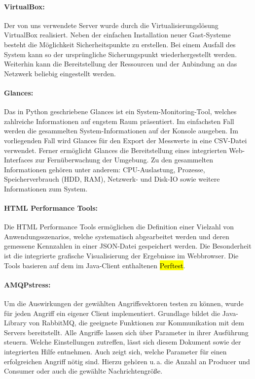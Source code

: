 \documentclass[	a4paper,
			11pt,
			oneside,
			parskip]{scrartcl}
\begin{document}
	\paragraph{VirtualBox:} Der von uns verwendete Server wurde durch die Virtualisierungslösung VirtualBox realisiert. Neben der einfachen Installation neuer Gast-Systeme besteht die Möglichkeit Sicherheitspunkte zu erstellen. Bei einem Ausfall des System kann so der ursprüngliche Sicherungspunkt wiederhergestellt werden. Weiterhin kann die Bereitstellung der Ressourcen und der Anbindung an das Netzwerk beliebig eingestellt werden.
	
	\paragraph{Glances:} Das in Python geschriebene Glances ist ein System-Monitoring-Tool, welches zahlreiche Informationen auf engstem Raum präsentiert. Im einfachsten Fall werden die gesammelten System-Informationen auf der Konsole ausgeben.
	 Im vorliegenden Fall wird Glances für den Export der Messwerte in eine CSV-Datei verwendet. Ferner ermöglicht Glances die Bereitstellung eines integrierten Web-Interfaces zur Fernüberwachung der Umgebung.
	 Zu den gesammelten Informationen gehören unter anderem: CPU-Auslastung, Prozesse, Speicherverbrauch (HDD, RAM), Netzwerk- und Disk-IO sowie weitere Informationen zum System.

	\paragraph{HTML Performance Tools:} Die HTML Performance Tools ermöglichen die Definition einer Vielzahl von Anwendungsszenarios, welche systematisch abgearbeitet werden und deren gemessene Kennzahlen in einer JSON-Datei gespeichert werden. Die Besonderheit ist die integrierte grafische Visualisierung der Ergebnisse im Webbrowser. Die Tools basieren auf dem im Java-Client enthaltenen \hl{Perftest}.
	
	\paragraph{AMQPstress:} Um die Auswirkungen der gewählten Angriffsvektoren testen zu können, wurde für jeden Angriff ein eigener Client implementiert. Grundlage bildet die Java-Library von RabbitMQ, die geeignete Funktionen zur Kommunikation mit dem Servers bereitstellt. Alle Angriffe lassen sich über Parameter in ihrer Ausführung steuern. Welche Einstellungen zutreffen, lässt sich diesem Dokument sowie der integrierten Hilfe entnehmen. Auch zeigt sich, welche Parameter für einen erfolgreichen Angriff nötig sind. Hierzu gehören u.\,a. die Anzahl an Producer und Consumer oder auch die gewählte Nachrichtengröße.
\end{document}
